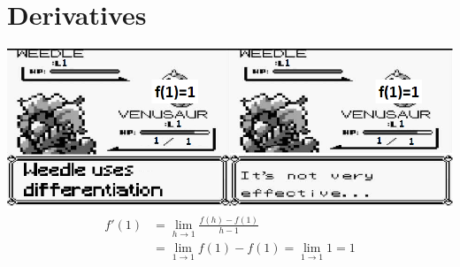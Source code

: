 \setcounter{section}{0}

\section{Derivatives}
\begin{center}
  \includegraphics[width=\textwidth]{differentiation.png}\\
  \vspace{-0.4cm}
\begin{align*}
  f'(1)&=\lim_{h\to 1}\frac{f(h)-f(1)}{h-1}\\
       &=\lim_{1\to 1}f(1)-f(1)=\lim_{1\to1}1 = 1
\end{align*}
\end{center}

